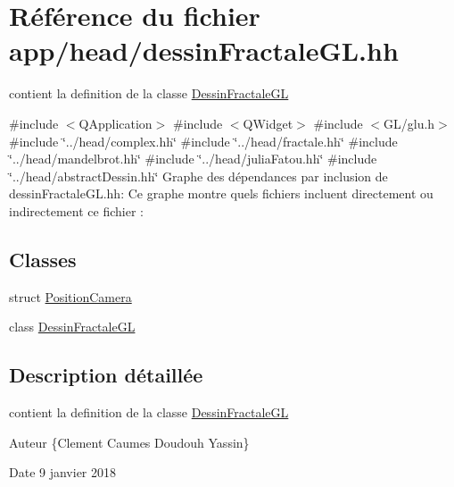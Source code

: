 \hypertarget{dessinFractaleGL_8hh}{}\section{Référence du fichier app/head/dessin\+Fractale\+GL.hh}
\label{dessinFractaleGL_8hh}


contient la definition de la classe \hyperlink{classDessinFractaleGL}{Dessin\+Fractale\+GL}  


{\ttfamily \#include $<$Q\+Application$>$}\newline
{\ttfamily \#include $<$Q\+Widget$>$}\newline
{\ttfamily \#include $<$G\+L/glu.\+h$>$}\newline
{\ttfamily \#include \char`\"{}../head/complex.\+hh\char`\"{}}\newline
{\ttfamily \#include \char`\"{}../head/fractale.\+hh\char`\"{}}\newline
{\ttfamily \#include \char`\"{}../head/mandelbrot.\+hh\char`\"{}}\newline
{\ttfamily \#include \char`\"{}../head/julia\+Fatou.\+hh\char`\"{}}\newline
{\ttfamily \#include \char`\"{}../head/abstract\+Dessin.\+hh\char`\"{}}\newline
Graphe des dépendances par inclusion de dessin\+Fractale\+G\+L.\+hh\+:
Ce graphe montre quels fichiers incluent directement ou indirectement ce fichier \+:
\subsection*{Classes}
\begin{DoxyCompactItemize}
\item 
struct \hyperlink{structPositionCamera}{Position\+Camera}
\item 
class \hyperlink{classDessinFractaleGL}{Dessin\+Fractale\+GL}
\end{DoxyCompactItemize}


\subsection{Description détaillée}
contient la definition de la classe \hyperlink{classDessinFractaleGL}{Dessin\+Fractale\+GL} 

\begin{DoxyAuthor}{Auteur}
\{Clement Caumes Doudouh Yassin\} 
\end{DoxyAuthor}
\begin{DoxyDate}{Date}
9 janvier 2018 
\end{DoxyDate}
